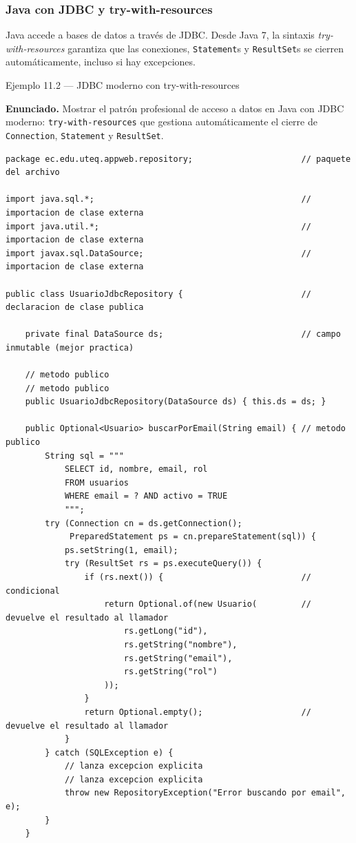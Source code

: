 \documentclass[11pt,a4paper,openany]{book}
\begin{document}
\subsubsection{Java con JDBC y try-with-resources}

Java accede a bases de datos a través de JDBC. Desde Java 7,
la sintaxis \emph{try-with-resources} garantiza que las conexiones,
\texttt{Statement}s y \texttt{ResultSet}s se cierren automáticamente,
incluso si hay excepciones.


\begin{cajaejemplo}{Ejemplo 11.2 --- JDBC moderno con try-with-resources}

\textbf{Enunciado.} Mostrar el patrón profesional de acceso a datos en Java con JDBC moderno: \texttt{try-with-resources} que gestiona automáticamente el cierre de \texttt{Connection}, \texttt{Statement} y \texttt{ResultSet}.

\begin{lstlisting}[style=java,caption={UsuarioJdbcRepository.java},label=lst:11.5]
package ec.edu.uteq.appweb.repository;                      // paquete del archivo

import java.sql.*;                                          // importacion de clase externa
import java.util.*;                                         // importacion de clase externa
import javax.sql.DataSource;                                // importacion de clase externa

public class UsuarioJdbcRepository {                        // declaracion de clase publica

    private final DataSource ds;                            // campo inmutable (mejor practica)

    // metodo publico
    // metodo publico
    public UsuarioJdbcRepository(DataSource ds) { this.ds = ds; }

    public Optional<Usuario> buscarPorEmail(String email) { // metodo publico
        String sql = """
            SELECT id, nombre, email, rol
            FROM usuarios
            WHERE email = ? AND activo = TRUE
            """;
        try (Connection cn = ds.getConnection();
             PreparedStatement ps = cn.prepareStatement(sql)) {
            ps.setString(1, email);
            try (ResultSet rs = ps.executeQuery()) {
                if (rs.next()) {                            // condicional
                    return Optional.of(new Usuario(         // devuelve el resultado al llamador
                        rs.getLong("id"),
                        rs.getString("nombre"),
                        rs.getString("email"),
                        rs.getString("rol")
                    ));
                }
                return Optional.empty();                    // devuelve el resultado al llamador
            }
        } catch (SQLException e) {
            // lanza excepcion explicita
            // lanza excepcion explicita
            throw new RepositoryException("Error buscando por email", e);
        }
    }


\end{lstlisting}
\end{cajaejemplo}
\end{document}

